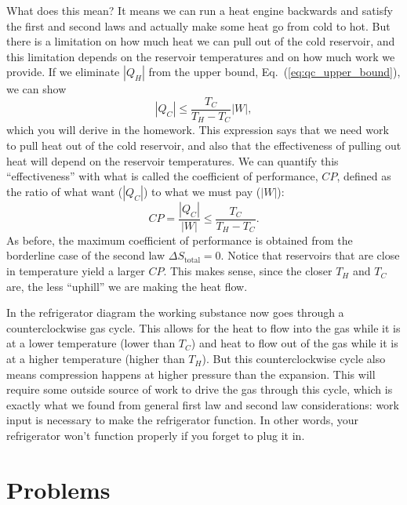 What does this mean?  It means we can run a heat engine backwards and
satisfy the first and second laws and actually make some heat go from
cold to hot.  But there is a limitation on how much heat we can pull
out of the cold reservoir, and this limitation depends on the
reservoir temperatures and on how much work we provide.  If we
eliminate $|Q_H|$ from the upper bound, Eq.~(\ref{eq:qc_upper_bound}),
we can show
\begin{equation}
|Q_C| \leq \frac{T_C}{T_H-T_C} |W|,
\label{eq:qc_upper_bound_ii}
\end{equation}
which you will derive in the homework.  This expression says that we
need work to pull heat out of the cold reservoir, and also that the
effectiveness of pulling out heat will depend on the reservoir
temperatures.  We can quantify this ``effectiveness'' with what is
called the coefficient of performance, $CP$, defined as the ratio of
what want ($|Q_C|$) to what we must pay ($|W|$):
\begin{equation}
CP = \frac{|Q_C|}{|W|} \leq  \frac{T_C}{T_H-T_C}.
\end{equation}
As before, the maximum coefficient of performance is obtained from the
borderline case of the second law $\Delta S_\text{total}=0$.
Notice that reservoirs that are close in temperature yield a larger
$CP$.  This makes sense, since the closer $T_H$ and $T_C$ are, the
less ``uphill'' we are making the heat flow.

In the refrigerator diagram the working substance now goes
through a counterclockwise gas cycle.  This allows for the heat to
flow into the gas while it is at a lower temperature (lower than
$T_C$) and heat to flow out of the gas while it is at a higher
temperature (higher than $T_H$).  But this counterclockwise cycle also
means compression happens at higher pressure than the expansion.  This
will require some outside source of work to drive the gas through this
cycle, which is exactly what we found from general first law and
second law considerations: work input is necessary to make the
refrigerator function.  In other words, your refrigerator won't function
properly if you forget to plug it in.



\newpage

\section*{Problems}

